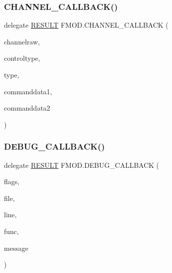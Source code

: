 \mbox{\label{namespace_f_m_o_d_a3094c885d2c4a21049c65cb016a4cd3e}} 
\subsubsection{\texorpdfstring{C\+H\+A\+N\+N\+E\+L\+\_\+\+C\+A\+L\+L\+B\+A\+C\+K()}{CHANNEL\_CALLBACK()}}
{\footnotesize\ttfamily delegate \hyperlink{namespace_f_m_o_d_a305d1176ef3f8c8815861a60407ac33d}{R\+E\+S\+U\+LT} F\+M\+O\+D.\+C\+H\+A\+N\+N\+E\+L\+\_\+\+C\+A\+L\+L\+B\+A\+CK (\begin{DoxyParamCaption}\item[{Int\+Ptr}]{channelraw,  }\item[{\hyperlink{namespace_f_m_o_d_adc4f7881733d8b2dc1577194a8e248e4}{C\+H\+A\+N\+N\+E\+L\+C\+O\+N\+T\+R\+O\+L\+\_\+\+T\+Y\+PE}}]{controltype,  }\item[{\hyperlink{namespace_f_m_o_d_a5d2474611c3f58385c86117a278bf1d7}{C\+H\+A\+N\+N\+E\+L\+C\+O\+N\+T\+R\+O\+L\+\_\+\+C\+A\+L\+L\+B\+A\+C\+K\+\_\+\+T\+Y\+PE}}]{type,  }\item[{Int\+Ptr}]{commanddata1,  }\item[{Int\+Ptr}]{commanddata2 }\end{DoxyParamCaption})}

\mbox{\label{namespace_f_m_o_d_a8af56b22e6aaa75d1cbe71accaa7d719}} 
\subsubsection{\texorpdfstring{D\+E\+B\+U\+G\+\_\+\+C\+A\+L\+L\+B\+A\+C\+K()}{DEBUG\_CALLBACK()}}
{\footnotesize\ttfamily delegate \hyperlink{namespace_f_m_o_d_a305d1176ef3f8c8815861a60407ac33d}{R\+E\+S\+U\+LT} F\+M\+O\+D.\+D\+E\+B\+U\+G\+\_\+\+C\+A\+L\+L\+B\+A\+CK (\begin{DoxyParamCaption}\item[{\hyperlink{namespace_f_m_o_d_ae26c0e42bca4d9ba2b529ed29cf35b33}{D\+E\+B\+U\+G\+\_\+\+F\+L\+A\+GS}}]{flags,  }\item[{string}]{file,  }\item[{int}]{line,  }\item[{string}]{func,  }\item[{string}]{message }\end{DoxyParamCaption})}

